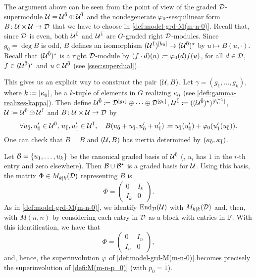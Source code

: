 The argument above can be seen from the point of view of the graded $\mathcal{D}$-supermodule $\mathcal U = \mathcal U^{\bar0} \oplus \mathcal U^{\bar1}$ and the nondegenerate $\varphi_0$-sesquilinear form $B\colon \mathcal U\times \mathcal U \to \mathcal{D}$ that we have to choose in \cref{def:model-grd-M(m-n-0)}. 
Recall that, since $\mathcal{D}$ is even, both $\mathcal U^{\bar0}$ and $\mathcal U^{\bar1}$ are $G$-graded right $\mathcal{D}$-modules. 
Since $g_0 = \deg B$ is odd, $B$ defines an isomorphism $(\mathcal U^{\bar1})^{[h_0]} \to (\mathcal U^{\bar0})^\star$ by $u \mapsto B(u, \cdot)$. 
Recall that $(\mathcal U^{\bar0})^\star$ is a right $\mathcal{D}$-module by $(f\cdot d) (u) \coloneqq \varphi_0(d) f(u)$, for all $d\in \mathcal{D}$, $f\in (\mathcal U^{\bar0})^\star$ and $u \in \mathcal U^{\bar0}$ (see \cref{ssec:superdual}).  

This gives us an explicit way to construct the pair $(\mathcal U, B)$. 
Let $\gamma = (g_1, \ldots, g_k)$, where $k \coloneqq |\kappa_{\bar{0}}|$, be a $k$-tuple of elements in $G$ 
realizing $\kappa_{\bar{0}}$ (see \cref{defi:gamma-realizes-kappa}). 
Then define $\mathcal U^{\bar0} \coloneqq \mathcal{D}^{[g_1]}\oplus \cdots \oplus \mathcal{D}^{[g_k]}$, $\mathcal U^{\bar1} \coloneqq ((\mathcal U^{\bar0})^\star)^{[h_0^{-1}]}$, $\mathcal U \coloneqq \mathcal U^{\bar0} \oplus \mathcal U^{\bar1}$ and $B\colon \mathcal U\times\mathcal U \to \mathcal{D}$ by
\[\label{eq:defi-B-for-P(n)}
    \forall u_{\bar{0}}, u_{\bar{0}}' \in \mathcal U^{\bar0}, \, u_{\bar{1}}, u_{\bar{1}}' \in \mathcal U^{\bar1}, \quad B(u_{\bar{0}} + u_{\bar{1}}, u_{\bar{0}}' + u_{\bar{1}}') \coloneqq u_{\bar{1}}(u_{\bar{0}}') + \varphi_0( u_{\bar{1}}' (u_{\bar{0}}) ).
\]
One can check that $\bar B = B$ and $(\mathcal U, B)$ has inertia determined by $(\kappa_{\bar{0}}, \kappa_{\bar{1}})$.

Let $\mathcal B = \{ u_1, \ldots, u_k \}$ be the canonical graded basis of $\mathcal U^{\bar0}$ (\ie, $u_i$ has $1$ in the $i$-th entry and zero elsewhere). 
Then $\mathcal B \cup \mathcal B^\star$ is a graded basis for $\mathcal U$. 
Using this basis, the matrix $\Phi \in M_{k|k}(\mathcal{D})$ representing $B$ is 
\[
    \Phi = 
    \begin{pmatrix}
        0 & I_{k}\\
        I_{k} & 0
    \end{pmatrix}.
\]
As in \cref{def:model-grd-M(m-n-0)}, we identify $\operatorname{End}_{\mathcal{D}} (\mathcal U)$ with $M_{k|k}(\mathcal{D})$ and, then, with $M(n, n)$ by considering each entry in $\mathcal{D}$ as a block with entries in $\mathbb{F}$. 
With this identification, we have that
\[\label{eq:matrix-Phi-for-P}
    \Phi = 
    \begin{pmatrix}
        0 & I_{n}\\
        I_{n} & 0
    \end{pmatrix}, 
\]
and, hence, the superinvolution $\varphi$ of \cref{def:model-grd-M(m-n-0)} becomes precisely the superinvolution of \cref{defi:M(m-n-p_0)} (with $p_0 = \bar 1$). 

